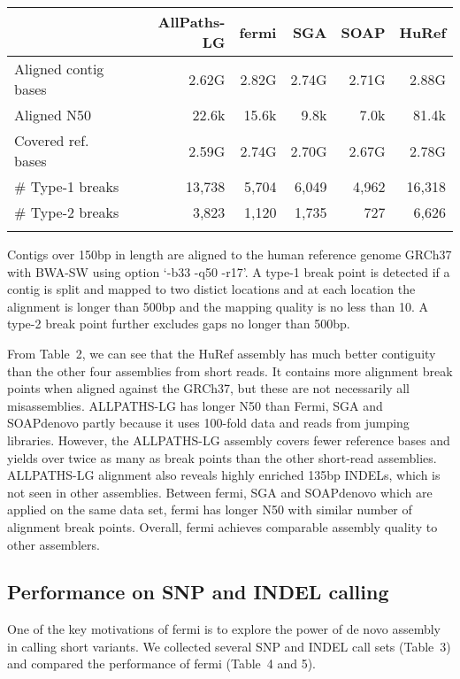 \documentclass{bioinfo}
\begin{document}
\begin{table}[!htb]
{\begin{tabular}{lrrrrr}
\toprule
& AllPaths-LG & fermi & SGA & SOAP & HuRef \\
\midrule
Aligned contig bases & 2.62G & 2.82G & 2.74G & 2.71G & 2.88G \\
Aligned N50          & 22.6k & 15.6k & 9.8k  & 7.0k  & 81.4k \\
Covered ref. bases   & 2.59G & 2.74G & 2.70G & 2.67G & 2.78G \\
\# Type-1 breaks & 13,738 & 5,704 & 6,049 & 4,962 & 16,318 \\
\# Type-2 breaks & 3,823 & 1,120 & 1,735 & 727 & 6,626 \\
\botrule
\end{tabular}}{Contigs over 150bp in length are aligned to the human reference
genome GRCh37 with BWA-SW using option `-b33 -q50 -r17'. A type-1 break point
is detected if a contig is split and mapped to two distict locations and at
each location the alignment is longer than 500bp and the mapping quality is no
less than 10. A type-2 break point further excludes gaps no longer than 500bp.} \end{table}

From Table~2, we can see that the HuRef assembly has much better
contiguity than the other four assemblies from short reads. It contains more
alignment break points when aligned against the GRCh37, but these are not
necessarily all misassemblies. ALLPATHS-LG has longer N50 than Fermi, SGA and
SOAPdenovo partly because it uses 100-fold data and reads from jumping
libraries. However, the ALLPATHS-LG assembly covers fewer reference bases and
yields over twice as many as break points than the other short-read assemblies.
ALLPATHS-LG alignment also reveals highly enriched 135bp INDELs, which is not
seen in other assemblies. Between fermi, SGA and SOAPdenovo which are applied
on the same data set, fermi has longer N50 with similar number of alignment
break points. Overall, fermi achieves comparable assembly quality to other
assemblers.

\subsection{Performance on SNP and INDEL calling}

One of the key motivations of fermi is to explore the power of de novo assembly
in calling short variants. We collected several SNP and INDEL call sets (Table~3)
and compared the performance of fermi (Table~4 and 5).
\end{document}
